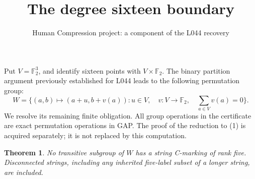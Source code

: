 \documentclass[11pt,a4paper]{article}
\title{The degree sixteen boundary}
\author{Human Compression project: a component of the L044 recovery}
\date{}
\newtheorem{theorem}{Theorem}
\begin{document}
\maketitle

Put $V=\mathbb F_2^3$, and identify sixteen points with
$V\times\mathbb F_2$. The binary partition argument previously
established for L044 leads to the following permutation group:
\[
 W=\{(a,b)\mapsto(a+u,b+v(a)):u\in V,\quad
                  v:V\to\mathbb F_2,\quad\sum_{a\in V}v(a)=0\}.
                                                        \tag{1}
\]
We resolve its remaining finite obligation. All group operations
in the certificate are exact permutation operations in GAP.
The proof of the reduction to (1) is acquired separately; it is
not replaced by this computation.

\begin{theorem}\label{finite}
No transitive subgroup of $W$ has a string C-marking of rank five.
Disconnected strings, including any inherited five-label subset
of a longer string, are included.
\end{theorem}
\end{document}
